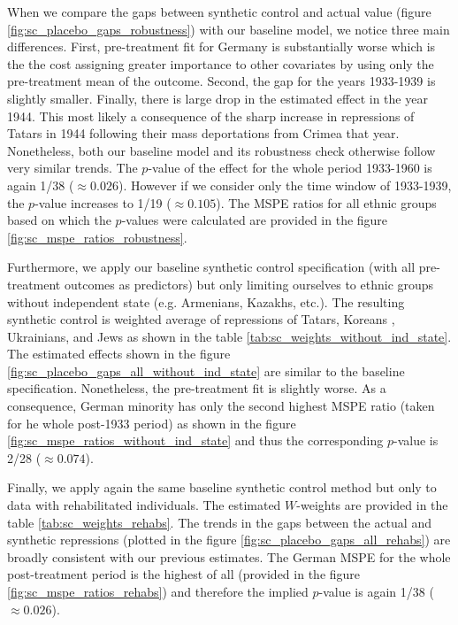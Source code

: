 When we compare the gaps between synthetic control and actual value (figure \ref{fig:sc_placebo_gaps_robustness}) with our baseline model, we notice three main differences. First, pre-treatment fit for Germany is substantially worse which is the the cost
assigning greater importance to other covariates by  using only the pre-treatment mean of the outcome. Second, the gap for the years 1933-1939 is slightly smaller. Finally, there is large drop in the estimated effect in the year 1944. This most likely a consequence of the sharp increase in repressions of Tatars in 1944 following their mass deportations from Crimea that year. 
Nonetheless, both our baseline model and its robustness check otherwise follow very similar trends.
The $p$-value of the effect for the whole period 1933-1960  is again 1/38 ($\approx 0.026$). However if we consider only the time window of  1933-1939, the 
$p$-value increases to 1/19 ($\approx 0.105$). The MSPE ratios for all ethnic groups based on which the $p$-values were calculated are provided in the figure \ref{fig:sc_mspe_ratios_robustness}.

Furthermore, we apply our baseline  synthetic control specification (with all pre-treatment outcomes as predictors) but only limiting ourselves to ethnic groups without independent state (e.g. Armenians, Kazakhs, etc.). The resulting synthetic control is weighted average of repressions of Tatars, Koreans , Ukrainians, and Jews as shown in the table \ref{tab:sc_weights_without_ind_state}. The estimated effects shown in the figure \ref{fig:sc_placebo_gaps_all_without_ind_state} are  similar to the baseline specification. Nonetheless, the pre-treatment fit is slightly worse. As a consequence, German minority has only the second highest MSPE ratio (taken for he whole post-1933 period) as shown in the figure \ref{fig:sc_mspe_ratios_without_ind_state} and thus the corresponding $p$-value is 2/28 ($\approx 0.074$).

Finally, we apply again the same baseline synthetic control method but only to data with rehabilitated individuals. The estimated $W$-weights are provided in the table \ref{tab:sc_weights_rehabs}. The trends in the gaps between the actual and synthetic repressions (plotted in the figure  \ref{fig:sc_placebo_gaps_all_rehabs}) are broadly consistent with  our previous estimates. 
The German MSPE for the whole post-treatment period is the highest of all (provided in the figure \ref{fig:sc_mspe_ratios_rehabs}) and therefore the implied $p$-value is again  1/38 ($\approx 0.026$).

%
%

